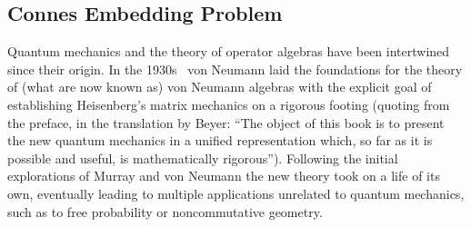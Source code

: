 \subsection{Connes Embedding Problem}


Quantum mechanics and the theory of operator algebras have been intertwined since their origin. In the 1930s~\cite{von1932mathematische} von Neumann laid the foundations for the theory of (what are now known as) von Neumann algebras with the explicit goal of establishing Heisenberg's matrix mechanics on a rigorous footing (quoting from the preface, in the translation by Beyer: ``The object of this book is to present the new quantum mechanics in a unified representation which, so far as it is possible and useful, is mathematically rigorous''). Following the initial explorations of Murray and von Neumann the new theory took on a life of its own, eventually leading to multiple applications unrelated to quantum mechanics, such as to free probability or noncommutative geometry. 

